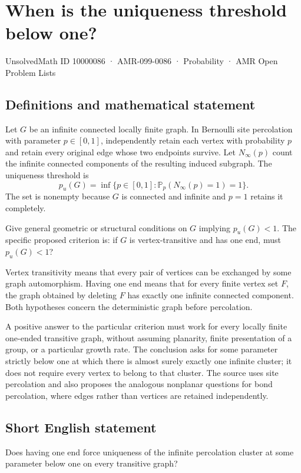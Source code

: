 \documentclass[11pt,a4paper]{article}
\begin{document}
\section*{When is the uniqueness threshold below one?}\label{10000086}
{\small UnsolvedMath ID 10000086 · AMR-099-0086 · Probability · AMR Open Problem Lists}
\subsection{Definitions and mathematical statement}
Let $G$ be an infinite connected locally finite graph. In Bernoulli site percolation with parameter $p\in[0,1]$, independently retain each vertex with probability $p$ and retain every original edge whose two endpoints survive. Let $N_\infty(p)$ count the infinite connected components of the resulting induced subgraph. The uniqueness threshold is
\[
p_u(G)=\inf\{p\in[0,1]:\mathbb P_p(N_\infty(p)=1)=1\}.
\]
The set is nonempty because $G$ is connected and infinite and $p=1$ retains it completely.

Give general geometric or structural conditions on $G$ implying $p_u(G)<1$. The specific proposed criterion is: if $G$ is vertex-transitive and has one end, must $p_u(G)<1$?

Vertex transitivity means that every pair of vertices can be exchanged by some graph automorphism. Having one end means that for every finite vertex set $F$, the graph obtained by deleting $F$ has exactly one infinite connected component. Both hypotheses concern the deterministic graph before percolation.

A positive answer to the particular criterion must work for every locally finite one-ended transitive graph, without assuming planarity, finite presentation of a group, or a particular growth rate. The conclusion asks for some parameter strictly below one at which there is almost surely exactly one infinite cluster; it does not require every vertex to belong to that cluster. The source uses site percolation and also proposes the analogous nonplanar questions for bond percolation, where edges rather than vertices are retained independently.
\subsection{Short English statement}
Does having one end force uniqueness of the infinite percolation cluster at some parameter below one on every transitive graph?
\end{document}
